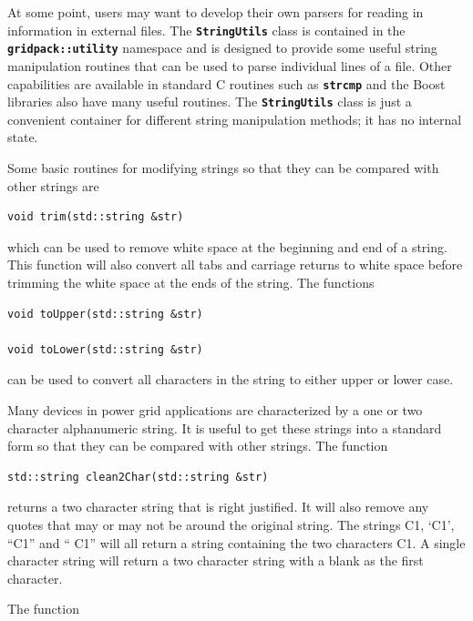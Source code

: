 \documentclass[12pt]{report} %
\begin{document}
At some point, users may want to develop their own parsers for reading in information in external files. The \texttt{\textbf{StringUtils}} class is contained in the \texttt{\textbf{gridpack::utility}} namespace and is designed to provide some useful string manipulation routines that can be used to parse individual lines of a file. Other capabilities are available in standard C routines such as \texttt{\textbf{strcmp}} and the Boost libraries also have many useful routines. The \texttt{\textbf{StringUtils}} class is just a convenient container for different string manipulation methods; it has no internal state.

Some basic routines for modifying strings so that they can be compared with other strings are

{
\color{red}
\begin{Verbatim}[fontseries=b]
void trim(std::string &str)
\end{Verbatim}
}

which can be used to remove white space at the beginning and end of a string. This function will also convert all tabs and carriage returns to white space before trimming the white space at the ends of the string. The functions

{
\color{red}
\begin{Verbatim}[fontseries=b]
void toUpper(std::string &str)

void toLower(std::string &str)
\end{Verbatim}
}

can be used to convert all characters in the string to either upper or lower case.

Many devices in power grid applications are characterized by a one or two character alphanumeric string. It is useful to get these strings into a standard form so that they can be compared with other strings. The function

{
\color{red}
\begin{Verbatim}[fontseries=b]
std::string clean2Char(std::string &str)
\end{Verbatim}
}

returns a two character string that is right justified. It will also remove any quotes that may or may not be around the original string. The strings C1, `C1', ``C1'' and ``  C1'' will all return a string containing the two characters C1. A single character string will return a two character string with a blank as the first character.

The function
\end{document}
